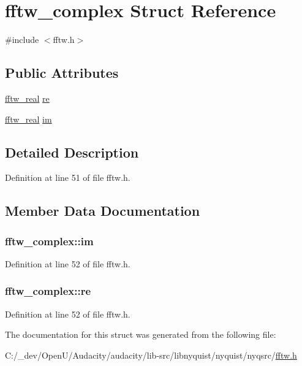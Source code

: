 \hypertarget{structfftw__complex}{}\section{fftw\+\_\+complex Struct Reference}
\label{structfftw__complex}


{\ttfamily \#include $<$fftw.\+h$>$}

\subsection*{Public Attributes}
\begin{DoxyCompactItemize}
\item 
\hyperlink{fftw_8h_a8a2fb05c0a5d5f1c295ef2e7268c7476}{fftw\+\_\+real} \hyperlink{structfftw__complex_ad34b12338fe65eb4087afb335c9a5ffc}{re}
\item 
\hyperlink{fftw_8h_a8a2fb05c0a5d5f1c295ef2e7268c7476}{fftw\+\_\+real} \hyperlink{structfftw__complex_a4b029960928065e38bc1087d7575503c}{im}
\end{DoxyCompactItemize}


\subsection{Detailed Description}


Definition at line 51 of file fftw.\+h.



\subsection{Member Data Documentation}
\subsubsection[{\texorpdfstring{im}{im}}]{ fftw\+\_\+complex\+::im}\hypertarget{structfftw__complex_a4b029960928065e38bc1087d7575503c}{}\label{structfftw__complex_a4b029960928065e38bc1087d7575503c}


Definition at line 52 of file fftw.\+h.

\subsubsection[{\texorpdfstring{re}{re}}]{ fftw\+\_\+complex\+::re}\hypertarget{structfftw__complex_ad34b12338fe65eb4087afb335c9a5ffc}{}\label{structfftw__complex_ad34b12338fe65eb4087afb335c9a5ffc}


Definition at line 52 of file fftw.\+h.



The documentation for this struct was generated from the following file\+:\begin{DoxyCompactItemize}
\item 
C\+:/\+\_\+dev/\+Open\+U/\+Audacity/audacity/lib-\/src/libnyquist/nyquist/nyqsrc/\hyperlink{fftw_8h}{fftw.\+h}\end{DoxyCompactItemize}

